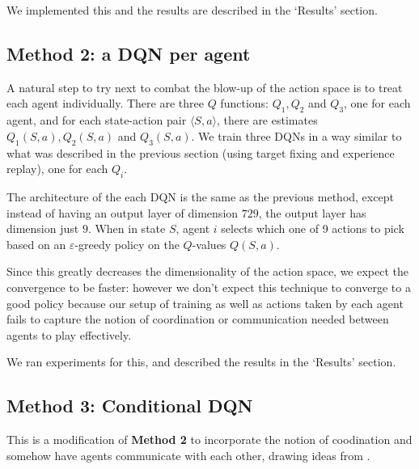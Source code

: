 \documentclass{article}
\begin{document}
We implemented this and the results are described in
the `Results' section.

\subsection{Method 2: a DQN per agent}
A natural step to try next to combat the blow-up
of the action space is to treat each agent
individually. There are three $Q$ functions:
$Q_1, Q_2$ and $Q_3$, one for each agent, and
for each state-action pair $\langle S,a\rangle$,
there are estimates $Q_1(S,a),Q_2(S,a)$ and
$Q_3(S,a)$. We train three DQNs in a way similar
to what was described in the previous section
(using target fixing and experience replay), one for
each $Q_i$.

The architecture of the each DQN is the same as the
previous method, except instead of having an output
layer of dimension $729$, the output layer has dimension
just $9$. When in state $S$, agent $i$ selects which one
of 9 actions to pick based on an $\varepsilon$-greedy policy
on the $Q$-values $Q(S,a)$.

Since this greatly decreases the dimensionality of
the action space, we expect the convergence to be
faster: however we don't expect this technique to
converge to a good policy because our setup
of training as well as actions taken by each agent
fails to capture the notion of coordination or
communication needed between agents to play effectively.

We ran experiments for this, and described the results in
the `Results' section.

\subsection{Method 3: Conditional DQN}
This is a modification of \textbf{Method 2} to incorporate
the notion of coodination and somehow have agents communicate
with each other, drawing ideas from \cite{foerster2016learning}.
\end{document}
